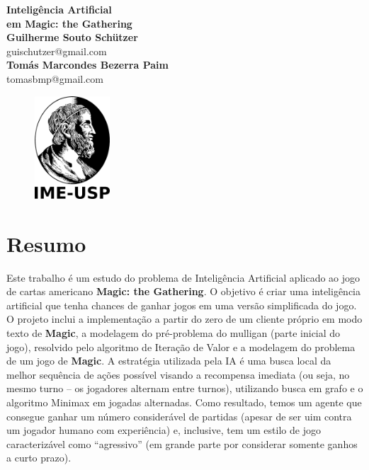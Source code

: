 \documentclass[dvipsnames]{book}
\begin{document}
  \begin{titlepage}
  \begin{center}
   {\huge\bfseries Inteligência Artificial \\ em \textbf{Magic: the Gathering}\\}
   \vspace{1.5cm}
   {\bfseries Guilherme Souto Schützer}\\[5pt]
   guischutzer@gmail.com\\[14pt]
   \vspace{0.5cm}
   {\bfseries Tomás Marcondes Bezerra Paim}\\[5pt]
   tomasbmp@gmail.com\\[14pt]
   \vspace{2cm}
  {\begin{figure}[!h]
          \centering
              \includegraphics[width=0.25\textwidth]{picstcc/ime.png}
  \end{figure}}
   \vspace{0.4cm}
 \end{center}
  \end{titlepage}

\chapter*{Resumo}
Este trabalho é um estudo do problema de Inteligência Artificial aplicado ao jogo de cartas americano \textbf{Magic: the Gathering}. O objetivo é criar uma inteligência artificial que tenha chances de ganhar jogos em uma versão simplificada do jogo. O projeto inclui a implementação a partir do zero de um cliente próprio em modo texto de \textbf{Magic}, a modelagem do pré-problema do mulligan (parte inicial do jogo), resolvido pelo algoritmo de Iteração de Valor e a modelagem do problema de um jogo de \textbf{Magic}. A estratégia utilizada pela IA é uma busca local da melhor sequência de ações possível visando a recompensa imediata (ou seja, no mesmo turno -- os jogadores alternam entre turnos), utilizando busca em grafo e o algoritmo Minimax em jogadas alternadas. Como resultado, temos um agente que consegue ganhar um número considerável de partidas (apesar de ser uim contra um jogador humano com experiência) e, inclusive, tem um estilo de jogo caracterizável como ``agressivo'' (em grande parte por considerar somente ganhos a curto prazo).
\end{document}
